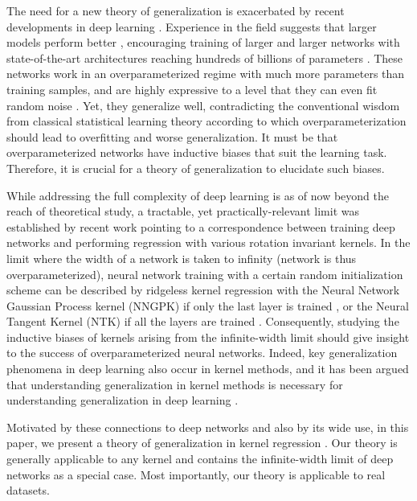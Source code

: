 \documentclass[11pt]{article}
\begin{document}
The need for a new theory of generalization is exacerbated by recent developments in deep learning \cite{lecun2015deep}.
Experience in the field suggests that larger models perform better \cite{nakkiran2019deep,kaplan2020scaling,lepikhin2020gshard}, encouraging training of larger and larger networks with state-of-the-art architectures reaching hundreds of billions of parameters \cite{lepikhin2020gshard}. These networks work in an overparameterized regime \cite{belkin2019reconciling,nakkiran2019deep} with much more parameters than training samples, and are highly expressive to a level that they can even fit random noise \cite{zhang2016understanding}. Yet, they generalize well, contradicting the conventional wisdom from classical statistical learning theory \cite{hastie2009elements,belkin2019reconciling,Vapnik1998} according to which  overparameterization should lead to overfitting and  worse generalization. It must be that overparameterized networks have inductive biases that suit the learning task. Therefore, it is crucial for a theory of generalization to elucidate such biases.

While addressing the full complexity of deep learning is as of now beyond the reach of theoretical study, a tractable, yet practically-relevant limit was established by recent work pointing to a correspondence between training deep networks and performing regression with various rotation invariant kernels. In the limit where the width of a network is taken to infinity (network is thus overparameterized), neural network training with a certain random initialization scheme can be described by ridgeless kernel regression with the Neural Network Gaussian Process kernel (NNGPK) if only the last layer is trained \cite{neal1996bayesian,cho2009kernel,matthews2018gaussian,lee2017deep}, or the Neural Tangent Kernel (NTK) if all the layers are trained  \cite{jacot2018neural}. Consequently, studying the inductive biases of kernels arising from the infinite-width limit should give insight to the success of overparameterized neural networks. Indeed, key generalization phenomena in deep learning also occur in kernel methods, and it has been argued that understanding generalization in kernel methods is necessary for understanding generalization in deep learning \cite{belkin2018understand}.

Motivated by these connections to deep networks and also by its wide use, in this paper, we present a theory of generalization in kernel regression \cite{wahba1990spline,evgeniou2000regularization,shawe2004kernel,mohri2018foundations,jacot2020kernel}. Our theory is generally applicable to any kernel and contains the infinite-width limit of deep networks as a special case. Most importantly, our theory is applicable to real datasets.
\end{document}
